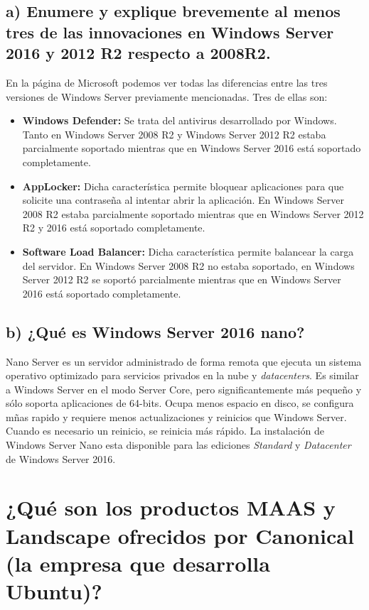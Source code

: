 \documentclass[a4paper,titlepage,12pt]{scrartcl}	%
\numberwithin{figure}{section} %
\numberwithin{table}{section} %
\begin{document}
	\subsection[a) Enumere y explique brevemente al menos tres de las innovaciones en Windows Server 2016 y 2012 R2 respecto a 2008R2.]{\textbf{a)} Enumere y explique brevemente al menos tres de las innovaciones en Windows Server 2016 y 2012 R2 respecto a 2008R2.}
	En la página de Microsoft \cite{DiferenciasWindowsServer} podemos ver todas las diferencias entre las tres versiones de Windows Server previamente mencionadas. Tres de ellas son:
	\begin{itemize}
		\item \textbf{Windows Defender: } Se trata del antivirus desarrollado por Windows. Tanto en Windows Server 2008 R2 y Windows Server 2012 R2 estaba parcialmente soportado mientras que en Windows Server 2016 está soportado completamente.
		\item \textbf{AppLocker: } Dicha característica permite bloquear aplicaciones para que solicite una contraseña al intentar abrir la aplicación. En Windows Server 2008 R2 estaba parcialmente soportado mientras que en Windows Server 2012 R2 y 2016 está soportado completamente.
		\item \textbf{Software Load Balancer: } Dicha característica permite balancear la carga del servidor. En Windows Server 2008 R2 no estaba soportado, en Windows Server 2012 R2 se soportó parcialmente mientras que en Windows Server 2016 está soportado completamente.
	\end{itemize}

	\subsection[b) ¿Qué es Windows Server 2016 nano?]{\textbf{b)} ¿Qué es Windows Server 2016 nano?}
	Nano Server es un servidor administrado de forma remota que ejecuta un sistema operativo optimizado para servicios privados en la nube y \textit{datacenters}. Es similar a Windows Server en el modo Server Core, pero significantemente más pequeño y sólo soporta aplicaciones de 64-bits. Ocupa menos espacio en disco, se configura mñas rapido y requiere menos actualizaciones y reinicios que Windows Server. Cuando es necesario un reinicio, se reinicia más rápido. La instalación de Windows Server Nano esta disponible para las ediciones \textit{Standard} y \textit{Datacenter} de Windows Server 2016. \cite{WindowsServerNano}
	

	\section[¿Qué son los productos MAAS y Landscape ofrecidos por Canonical (la empresa que desarrolla Ubuntu)?]{¿Qué son los productos MAAS y Landscape ofrecidos por Canonical (la empresa que desarrolla Ubuntu)?}
	
\end{document}
